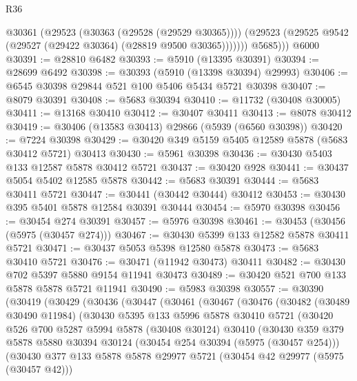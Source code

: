 \begin{lexlean}{R36}
\begin{coremodule}
            @30361
              (@29523 (@30363 (@29528 (@29529 @30365))))
              (@29523 (@29525 @9542 (@29527 (@29422 @30364) (@28819 @9500 @30365)))))))
          @5685)))
    @6000
@30391 := @28810 @6482
@30393 := @5910 (@13395 @30391)
@30394 := @28699 @6492
@30398 := @30393 (@5910 (@13398 @30394) @29993)
@30406 := @6545 @30398 @29844 @521 @100 @5406 @5434 @5721 @30398
@30407 := @8079 @30391
@30408 := @5683 @30394
@30410 := @11732 (@30408 @30005)
@30411 := @13168 @30410
@30412 := @30407 @30411
@30413 := @8078 @30412
@30419 := @30406 (@13583 @30413) @29866 (@5939 (@6560 @30398))
@30420 := @7224 @30398
@30429 := @30420 @349 @5159 @5405 @12589 @5878 (@5683 @30412 @5721) @30413
@30430 := @5961 @30398
@30436 := @30430 @5403 @133 @12587 @5878 @30412 @5721
@30437 := @30420 @928
@30441 := @30437 @5054 @5402 @12585 @5878
@30442 := @5683 @30391
@30444 := @5683 @30411 @5721
@30447 := @30441 (@30442 @30444) @30412
@30453 := @30430 @395 @5401 @5878 @12584 @30391 @30444
@30454 := @5970 @30398
@30456 := @30454 @274 @30391
@30457 := @5976 @30398
@30461 := @30453 (@30456 (@5975 (@30457 @274)))
@30467 := @30430 @5399 @133 @12582 @5878 @30411 @5721
@30471 := @30437 @5053 @5398 @12580 @5878
@30473 := @5683 @30410 @5721
@30476 := @30471 (@11942 @30473) @30411
@30482 := @30430 @702 @5397 @5880 @9154 @11941 @30473
@30489 := @30420 @521 @700 @133 @5878 @5878 @5721 @11941
@30490 := @5983 @30398
@30557 := @30390
    (@30419
      (@30429
        (@30436
          (@30447
            (@30461
              (@30467
                (@30476
                  (@30482
                    (@30489 @30490 @11984)
                    (@30430
                      @5395
                      @133
                      @5996
                      @5878
                      @30410
                      @5721
                      (@30420
                        @526
                        @700
                        @5287
                        @5994
                        @5878
                        (@30408 @30124)
                        @30410
                        (@30430
                          @359
                          @379
                          @5878
                          @5880
                          @30394
                          @30124
                          (@30454 @254 @30394 (@5975 (@30457 @254)))
                          (@30430
                            @377
                            @133
                            @5878
                            @5878
                            @29977
                            @5721
                            (@30454 @42 @29977 (@5975 (@30457 @42)))

\end{coremodule}
\end{lexlean}

